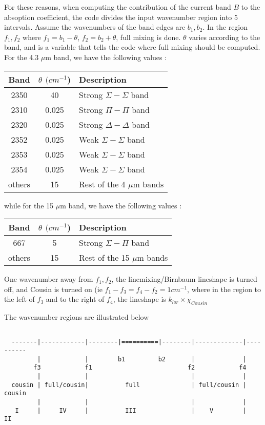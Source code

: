 \documentclass[11pt]{article}
\begin{document}
For these reasons, when computing the contribution of the current band $B$ to 
the absoption coefficient, the code divides the input wavenumber region into 
5 intervals. Assume the wavenumbers of the band edges are $b_{1},b_{2}$. 
In the region $f_{1},f_{2}$ where $f_{1} = b_{1} - \theta$,
$f_{2} = b_{2} + \theta $, full mixing is done. $\theta$ varies according to 
the band, and is a variable that tells the code where full mixing should
be computed. For the 4.3 $\mu$m band, we have the following values :
\begin{longtable}{ccl}
Band & $\theta$ $(cm^{-1}$) & Description \\
\hline
2350 &    40            &Strong $\Sigma-\Sigma$ band \\
2310 &    0.025         &Strong $\Pi-\Pi$ band \\
2320 &    0.025         &Strong $\Delta-\Delta$ band \\
2352 &    0.025         &Weak $\Sigma-\Sigma$ band \\
2353 &    0.025         &Weak $\Sigma-\Sigma$ band \\
2354 &    0.025         &Weak $\Sigma-\Sigma$ band \\
others &  15            &Rest of the 4 $\mu$m bands\\
\hline
\end{longtable}

while for the 15 $\mu$m band, we have the following values :
\begin{longtable}{ccl}
Band & $\theta$ $(cm^{-1}$) & Description \\
\hline
667     & 5              & Strong $\Sigma-\Pi$ band \\
others  & 15             & Rest of the 15 $\mu$m bands\\
\hline
\end{longtable}

One wavenumber away from $f_{1},f_{2}$, the linemixing/Birnbaum lineshape is 
turned off, and Cousin is turned on (ie $f_{1}-f_{3}=f_{4}-f_{2} = 1 cm^{-1}$,
where in the region to the left of $f_{3}$ and to the right of $f_{4}$, the 
lineshape is $k_{lor} \times \chi_{Cousin}$

The wavenumber regions are illustrated below

\begin{verbatim}

  -------|------------|--------|==========|--------|-------------|----------
         |            |        b1         b2       |             |
        f3            f1                          f2            f4
         |            |                            |             | 
  cousin | full/cousin|          full              | full/cousin |  cousin    
         |            |                            |             | 
   I     |     IV     |          III               |    V        |    II

\end{verbatim}
\end{document}
